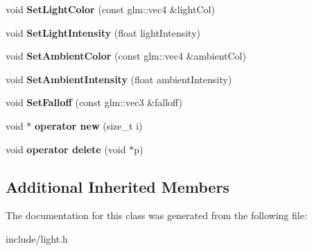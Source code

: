 \begin{DoxyCompactItemize}
\item 
\hypertarget{class_z_e_g_l_1_1_light_a6cd065d6ac3626619d604f1cc036b399}{}void {\bfseries Set\+Light\+Color} (const glm\+::vec4 \&light\+Col)\label{class_z_e_g_l_1_1_light_a6cd065d6ac3626619d604f1cc036b399}

\item 
\hypertarget{class_z_e_g_l_1_1_light_ace2c713bef08c46068528fc5d5e42f73}{}void {\bfseries Set\+Light\+Intensity} (float light\+Intensity)\label{class_z_e_g_l_1_1_light_ace2c713bef08c46068528fc5d5e42f73}

\item 
\hypertarget{class_z_e_g_l_1_1_light_aa254cfda106426ae7e9ced71d2e853bb}{}void {\bfseries Set\+Ambient\+Color} (const glm\+::vec4 \&ambient\+Col)\label{class_z_e_g_l_1_1_light_aa254cfda106426ae7e9ced71d2e853bb}

\item 
\hypertarget{class_z_e_g_l_1_1_light_a3dc02ff4e88b483a1329072b573c90a2}{}void {\bfseries Set\+Ambient\+Intensity} (float ambient\+Intensity)\label{class_z_e_g_l_1_1_light_a3dc02ff4e88b483a1329072b573c90a2}

\item 
\hypertarget{class_z_e_g_l_1_1_light_aa60721397b726b95732cf99068b017fc}{}void {\bfseries Set\+Falloff} (const glm\+::vec3 \&falloff)\label{class_z_e_g_l_1_1_light_aa60721397b726b95732cf99068b017fc}

\item 
\hypertarget{class_z_e_g_l_1_1_light_abf084fc44a8df822ac07dba7a9b8891e}{}void $\ast$ {\bfseries operator new} (size\+\_\+t i)\label{class_z_e_g_l_1_1_light_abf084fc44a8df822ac07dba7a9b8891e}

\item 
\hypertarget{class_z_e_g_l_1_1_light_a12d5bb4765b77d6bd9bbc0d9986bce8d}{}void {\bfseries operator delete} (void $\ast$p)\label{class_z_e_g_l_1_1_light_a12d5bb4765b77d6bd9bbc0d9986bce8d}

\end{DoxyCompactItemize}
\subsection*{Additional Inherited Members}


The documentation for this class was generated from the following file\+:\begin{DoxyCompactItemize}
\item 
include/light.\+h\end{DoxyCompactItemize}
